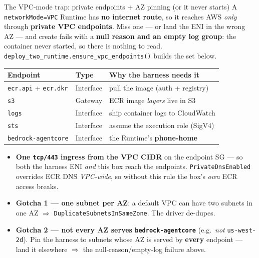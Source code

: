 \documentclass[aspectratio=169]{beamer}
\begin{document}
\begin{frame}{The VPC-mode trap: private endpoints + AZ pinning (or it never starts)}
  \footnotesize A \texttt{networkMode=VPC} Runtime has \textbf{no internet route}, so it reaches AWS
  \emph{only} through \textbf{private VPC endpoints}. Miss one --- or land the ENI in the wrong AZ ---
  and create fails with a \textbf{null reason and an empty log group}: the container never started, so
  there is nothing to read. \texttt{deploy\_two\_runtime.ensure\_vpc\_endpoints()} builds the set below.
  \vspace{0.2em}
  \begin{center}\scriptsize
  \begin{tabular}{@{}p{3.1cm}p{2.0cm}p{5.4cm}@{}}
    \toprule
    \textbf{Endpoint} & \textbf{Type} & \textbf{Why the harness needs it} \\
    \midrule
    \texttt{ecr.api} + \texttt{ecr.dkr} & Interface & pull the image (auth + registry) \\
    \texttt{s3} & Gateway & ECR image \emph{layers} live in S3 \\
    \texttt{logs} & Interface & ship container logs to CloudWatch \\
    \texttt{sts} & Interface & assume the execution role (SigV4) \\
    \texttt{bedrock-agentcore} & Interface & the Runtime's \textbf{phone-home} \\
    \bottomrule
  \end{tabular}
  \end{center}
  \vspace{0.2em}
  \begin{itemize}\setlength\itemsep{0.1em}
    \item \textbf{One \texttt{tcp/443} ingress from the VPC CIDR} on the endpoint SG --- so both the
      harness ENI \emph{and} this box reach the endpoints. \texttt{PrivateDnsEnabled} overrides ECR DNS
      \emph{VPC-wide}, so without this rule the box's \emph{own} ECR access breaks.
    \item \textbf{Gotcha 1 --- one subnet per AZ}: a default VPC can have two subnets in one AZ $\Rightarrow$
      \texttt{DuplicateSubnetsInSameZone}. The driver de-dupes.
    \item \textbf{Gotcha 2 --- not every AZ serves \texttt{bedrock-agentcore}} (e.g.\ \emph{not}
      \texttt{us-west-2d}). Pin the harness to subnets whose AZ is served by \textbf{every} endpoint ---
      land it elsewhere $\Rightarrow$ the null-reason/empty-log failure above.
  \end{itemize}
\end{frame}
\end{document}
